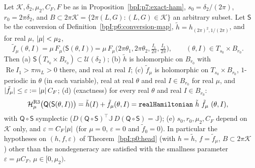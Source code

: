 \begin{corollary}\label{bpI:p7:period-one}
Let $\mathcal K,\delta_2,\mu_2,C_F,F$ be as in Proposition~\ref{bpI:p7:exact-ham}, $s_0=\delta_2/(2\pi)$, $r_0=2\pi\delta_2$, and $B\subset2\pi\mathcal K=\{2\pi(L,G):(L,G)\in\mathcal K\}$ an arbitrary subset. Let $\mathsf S$ be the conversion of Definition~\ref{bpI:p6:conversion-map}, $\tilde h=h_{(2\pi)^2,1/(2\pi)}$, and for real $\mu$, $\lvert \mu\rvert<\mu_2$,
\[
\tilde f_\mu(\theta,I)=\mu\,F_\mu\bigl(\mathsf S(\theta,I)\bigr)=\mu\,F_\mu\bigl(2\pi\theta_1,2\pi\theta_2,\tfrac{I_1}{2\pi},\tfrac{I_2}{2\pi}\bigr),\qquad(\theta,I)\in T_{s_0}\times B_{r_0}.
\]
Then (a) $\mathsf S(T_{s_0}\times B_{r_0})\subset\mathcal U(\delta_2)$; (b) $\tilde h$ is holomorphic on $B_{r_0}$ with $\operatorname{Re}I_1>\pi m_L>0$ there, and real at real $I$; (c) $\tilde f_\mu$ is holomorphic on $T_{s_0}\times B_{r_0}$, $1$-periodic in $\theta$ (in each variable), real at real $\theta$ and real $I\in B_{r_0}$ for real $\mu$, and
$\lvert \tilde f_\mu\rvert\le\varepsilon:=\lvert \mu\rvert\,C_F$; (d) (exactness) for every real $\theta$ and real $I\in B_{r_0}$:
\[
\Ham^{\rm R3}_\mu\bigl(\mathsf Q(\mathsf S(\theta,I))\bigr)=\tilde h(I)+\tilde f_\mu(\theta,I)=\Lean{realHamiltonian}\ \tilde h\ \tilde f_\mu\ (\theta,I),
\]
with $\mathsf Q\circ\mathsf S$ symplectic ($D(\mathsf Q\circ\mathsf S)^\top\mathbb J\,D(\mathsf Q\circ\mathsf S)=\mathbb J$); (e) $s_0,r_0,\mu_2,C_F$ depend on $\mathcal K$ only, and $\varepsilon=C_F\lvert \mu\rvert$ (for $\mu=0$, $\varepsilon=0$ and $\tilde f_0=0$).
In particular the hypotheses on $(h,f,\varepsilon)$ of Theorem~\ref{bpI:p0:head} (with $h=\tilde h$, $f=\tilde f_\mu$, $B\subset2\pi\mathcal K$) other than the nondegeneracy are satisfied with the smallness parameter $\varepsilon=\mu C_F$, $\mu\in[0,\mu_2)$.
\end{corollary}

